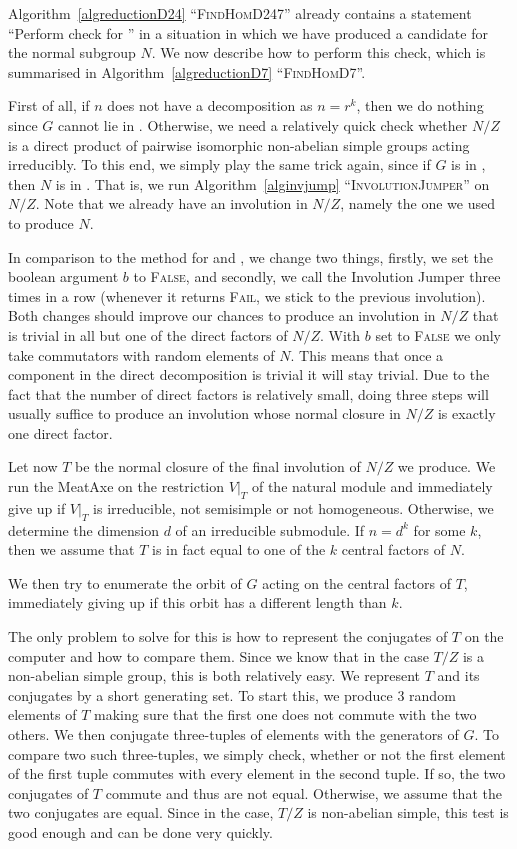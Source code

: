 Algorithm~\ref{algreductionD24} ``\textsc{FindHomD247}'' already contains a 
statement ``Perform check for '' in a situation in which we have produced
a candidate for the normal subgroup $N$. We now describe how to perform
this check, which is summarised in Algorithm~\ref{algreductionD7}
``\textsc{FindHomD7}''.
%

First of all, if $n$ does not have a decomposition as
$n=r^k$, then we do nothing since $G$ cannot lie in . Otherwise,
we need a relatively quick check whether $N/Z$ is a direct product of
pairwise isomorphic non-abelian simple groups acting irreducibly. To
this end, we simply play the same trick again, since if $G$ is in ,
then $N$ is in . That is, we run Algorithm~\ref{alginvjump}
``\textsc{InvolutionJumper}'' on $N/Z$. Note that we already have an
involution in $N/Z$, namely the one we used to produce $N$.

In comparison to the method for  and , we change two things,
firstly, we set the boolean argument $b$ to \textsc{False}, and
secondly, we call the Involution Jumper three times in a row (whenever
it returns \textsc{Fail}, we stick to the previous involution).
Both changes should improve our chances to produce an involution in $N/Z$
that is trivial in all but one of the direct factors of $N/Z$. With $b$ set
to \textsc{False} we only take commutators with random elements of $N$.
This means that once a component in the direct decomposition is trivial it
will stay trivial. Due to the fact that the number of direct factors is
relatively small, doing three steps will usually suffice to produce an
involution whose normal closure in $N/Z$ is exactly one direct factor.

Let now $T$ be the normal closure of the final involution of $N/Z$ we
produce. We run the MeatAxe on the restriction $V|_T$ of the natural module
and immediately give up if $V|_T$ is irreducible, not semisimple or not
homogeneous. Otherwise, we determine the dimension $d$ of an irreducible
submodule. If $n=d^k$ for some $k$, then we assume that $T$ is in fact
equal to one of the $k$ central factors of $N$.

We then try to enumerate the orbit of $G$ acting on the central factors of
$T$, immediately giving up if this orbit has a different length than $k$.

The only problem to solve for this is how to represent the conjugates of
$T$ on the computer and how to compare them. Since we know that in the 
case $T/Z$ is a non-abelian simple group, this is both relatively easy. We
represent $T$ and its conjugates by a short generating set. To start this,
we produce $3$ random elements of $T$ making sure that the first one does
not commute with the two others. We then conjugate three-tuples of elements
with the generators of $G$. To compare two such three-tuples, we simply
check, whether or not the first element of the first tuple commutes with
every element in the second tuple. If so, the two conjugates of $T$ commute
and thus are not equal. Otherwise, we assume that the two conjugates are
equal. Since in the  case, $T/Z$ is non-abelian simple, this test is
good enough and can be done very quickly.

